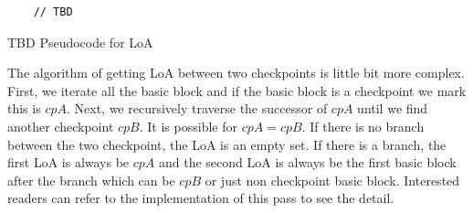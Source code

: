 \begin{listing}[htbp]
    \begin{verbatim}
    // TBD
    \end{verbatim}
    \caption{TBD Pseudocode for LoA}
    \label{listing:loa-pseudocode}
\end{listing}

The algorithm of getting LoA between two checkpoints is little bit more complex.
First, we iterate all the basic block and if the basic block is a checkpoint we
mark this is $cpA$. Next, we recursively traverse the successor of $cpA$ until
we find another checkpoint $cpB$. It is possible for $cpA = cpB$. If there is no
branch between the two checkpoint, the LoA is an empty set. If there is a
branch, the first LoA is always be $cpA$ and the second LoA is always be the
first basic block after the branch \textemdash{} which can be $cpB$ or just non
checkpoint basic block. Interested readers can refer to the implementation of
this pass to see the detail.
